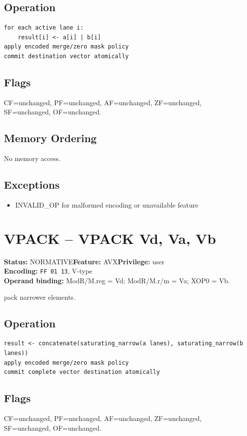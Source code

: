 \documentclass[10pt]{article}
\begin{document}
\subsection*{Operation}
\begin{lstlisting}
for each active lane i:
    result[i] <- a[i] | b[i]
apply encoded merge/zero mask policy
commit destination vector atomically
\end{lstlisting}
\subsection*{Flags}
CF=unchanged, PF=unchanged, AF=unchanged, ZF=unchanged, SF=unchanged, OF=unchanged.
\subsection*{Memory Ordering}
No memory access.
\subsection*{Exceptions}
\begin{itemize}
\item INVALID\_OP for malformed encoding or unavailable feature
\end{itemize}
\clearpage

\section{VPACK -- VPACK Vd, Va, Vb}
\textbf{Status:} NORMATIVE\quad \textbf{Feature:} AVX\quad \textbf{Privilege:} user\\
\textbf{Encoding:} \texttt{FF 01 13}, V-type\\
\textbf{Operand binding:} ModR/M.reg = Vd; ModR/M.r/m = Va; XOP0 = Vb.

pack narrower elements.

\subsection*{Operation}
\begin{lstlisting}
result <- concatenate(saturating_narrow(a lanes), saturating_narrow(b lanes))
apply encoded merge/zero mask policy
commit complete vector destination atomically
\end{lstlisting}
\subsection*{Flags}
CF=unchanged, PF=unchanged, AF=unchanged, ZF=unchanged, SF=unchanged, OF=unchanged.
\end{document}
